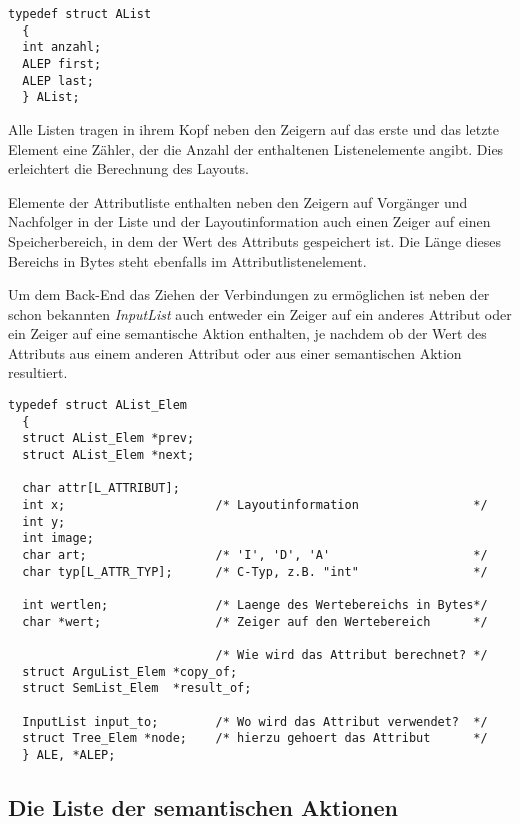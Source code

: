 \begin{small}\begin{verbatim}
typedef struct AList
  {
  int anzahl;
  ALEP first;
  ALEP last;
  } AList;
\end{verbatim}\end{small}

Alle Listen tragen in ihrem Kopf neben den Zeigern auf das erste und das letzte Element eine Z\"ahler, der die Anzahl der enthaltenen Listenelemente
angibt. Dies erleichtert die Berechnung des Layouts.

Elemente der Attributliste enthalten neben den Zeigern auf Vorg\"anger und Nachfolger in der Liste und der Layoutinformation auch einen Zeiger
auf einen Speicherbereich, in dem der Wert des Attributs gespeichert ist. Die L\"ange dieses Bereichs in Bytes steht ebenfalls im Attributlistenelement.

Um dem Back-End das Ziehen der Verbindungen zu erm\"oglichen ist neben der schon bekannten {\it InputList} auch entweder ein Zeiger auf ein anderes
Attribut oder ein Zeiger auf eine semantische Aktion enthalten, je nachdem ob der Wert des Attributs aus einem anderen Attribut oder aus einer semantischen Aktion resultiert.

\begin{small}\begin{verbatim}
typedef struct AList_Elem
  {
  struct AList_Elem *prev;
  struct AList_Elem *next;

  char attr[L_ATTRIBUT];
  int x;                     /* Layoutinformation                */
  int y;
  int image;
  char art;                  /* 'I', 'D', 'A'                    */
  char typ[L_ATTR_TYP];      /* C-Typ, z.B. "int"                */

  int wertlen;               /* Laenge des Wertebereichs in Bytes*/
  char *wert;                /* Zeiger auf den Wertebereich      */

                             /* Wie wird das Attribut berechnet? */
  struct ArguList_Elem *copy_of;
  struct SemList_Elem  *result_of;

  InputList input_to;        /* Wo wird das Attribut verwendet?  */
  struct Tree_Elem *node;    /* hierzu gehoert das Attribut      */
  } ALE, *ALEP;
\end{verbatim}\end{small}

\subsection{Die Liste der semantischen Aktionen}

